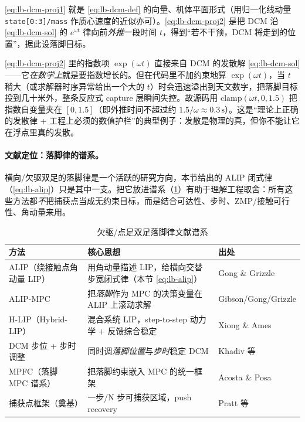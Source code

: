 \cref{eq:lb-dcm-proj1} 就是 \cref{eq:lb-dcm-def} 的向量、机体平面形式（用归一化线动量 \texttt{state[0:3]/\allowbreak mass} 作质心速度的近似亦可）。\cref{eq:lb-dcm-proj2} 是把 DCM 沿 \cref{eq:lb-dcm-sol} 的 $e^{\omega t}$ 律向前\emph{外推}一段时间 $t$，得到“若不干预，DCM 将走到的位置”，据此设落脚目标。

\begin{pitfall}\label{pit:lb-clamp-exp}
\cref{eq:lb-dcm-proj2} 里的指数项 $\exp(\omega t)$ 直接来自 DCM 的发散解 \cref{eq:lb-dcm-sol}——它\emph{在数学上}就是要指数增长的。但在代码里不加约束地算 $\exp(\omega t)$，当 $t$ 稍大（或求解器时序异常给出一个大的 $t$）时会迅速溢出到天文数字，把落脚目标投到几十米外，整条反应式 capture 层瞬间失控。故源码用 $\mathrm{clamp}(\omega t,0,1.5)$ 把指数自变量夹在 $[0,1.5]$（即外推时间不超过约 $1.5/\omega\approx 0.3\,\mathrm{s}$）。这是“理论上正确的发散律 + 工程上必须的数值护栏”的典型例子：发散是物理的真，但你不能让它在浮点里真的发散。
\end{pitfall}

\paragraph{文献定位：落脚律的谱系。}
横向/欠驱双足的落脚律是一个活跃的研究方向，本节给出的 ALIP 闭式律（\cref{eq:lb-alip}）只是其中一支。把它放进谱系（\cref{tab:lb-footstep-lit}）有助于理解工程取舍：所有这些方法都\emph{不}把捕获点当成无约束目标，而是结合可达性、步时、ZMP/接触可行性、角动量来用。

\begin{table}[H]\centering\small
\caption{欠驱/点足双足落脚律文献谱系}
\begin{tabular}{p{} p{} p{}}
\toprule
方法 & 核心思想 & 出处 \\
\midrule
ALIP（绕接触点角动量 LIP） & 用角动量描述 LIP，给横向交替步宽闭式律（本节 \cref{eq:lb-alip}） & Gong \& Grizzle\cite{gong2022alip} \\
ALIP-MPC & 把\emph{落脚}作为 MPC 的决策变量在 ALIP 上滚动求解 & Gibson/Gong/Grizzle\cite{gibson2022alipmpc} \\
H-LIP（Hybrid-LIP） & 混合系统 LIP，step-to-step 动力学 + 反馈综合稳定 & Xiong \& Ames\cite{xiong2022hlip} \\
DCM 步位 + 步时调整 & 同时调\emph{落脚位置}与\emph{步时}稳定 DCM & Khadiv 等\cite{khadiv2016stepping} \\
MPFC（落脚 MPC 谱系） & 把落脚约束嵌入 MPC 的统一框架 & Acosta \& Posa\cite{acosta2023mpfc} \\
捕获点框架（奠基） & 一步/N 步可捕获区域，push recovery & Pratt 等\cite{pratt2006capture} \\
\bottomrule
\end{tabular}
\label{tab:lb-footstep-lit}
\end{table}

